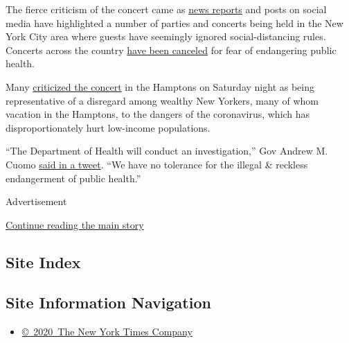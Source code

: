 The fierce criticism of the concert came as
\href{https://gothamist.com/arts-entertainment/we-all-want-pretend-isnt-happening-mask-free-pandemic-parties-are-popping-nyc}{news
reports} and posts on social media have highlighted a number of parties
and concerts being held in the New York City area where guests have
seemingly ignored social-distancing rules. Concerts across the country
\href{https://www.nytimes.com/2020/03/17/arts/music/concerts-cancelled-coronavirus.html}{have
been canceled} for fear of endangering public health.

Many
\href{https://twitter.com/FirenzeMike/status/1287484244433022979}{criticized
the concert} in the Hamptons on Saturday night as being representative
of a disregard among wealthy New Yorkers, many of whom vacation in the
Hamptons, to the dangers of the coronavirus, which has
disproportionately hurt low-income populations.

``The Department of Health will conduct an investigation,'' Gov Andrew
M. Cuomo
\href{https://twitter.com/NYGovCuomo/status/1287901143172108289}{said in
a tweet}. ``We have no tolerance for the illegal \& reckless
endangerment of public health.''

Advertisement

\protect\hyperlink{after-bottom}{Continue reading the main story}

\hypertarget{site-index}{%
\subsection{Site Index}\label{site-index}}

\hypertarget{site-information-navigation}{%
\subsection{Site Information
Navigation}\label{site-information-navigation}}

\begin{itemize}
\tightlist
\item
  \href{https://help.nytimes.com/hc/en-us/articles/115014792127-Copyright-notice}{©~2020~The
  New York Times Company}
\end{itemize}

